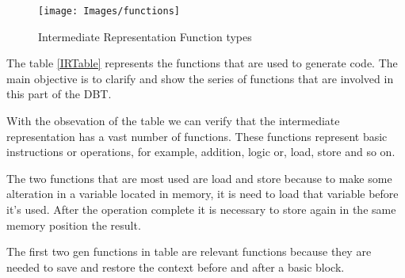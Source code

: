 \documentclass{report}
\begin{document}
	\begin{figure} [H]
		\centering
		\texttt{[image: Images/functions]}
		\caption{Intermediate Representation Function types}
		\label{fig:genfunctions}
	\end{figure}
	
	The table \ref{IRTable} represents the functions that are used to generate code. The main objective is  to clarify and show the series of functions that are involved in this part of the DBT. 
	
	With the obsevation of the table we can verify that the intermediate representation has a vast number of functions. These functions represent basic instructions or operations, for example, addition, logic or, load, store and so on.
	
	The two functions that are most used are load and store because to make some alteration in a variable located in memory, it is need to load that variable before it's used. After the operation complete it is necessary to store again in the same memory position the result.
	
	The first two gen functions in table are relevant functions because they are needed to save and restore the context before and after a basic block.
	
\end{document}
